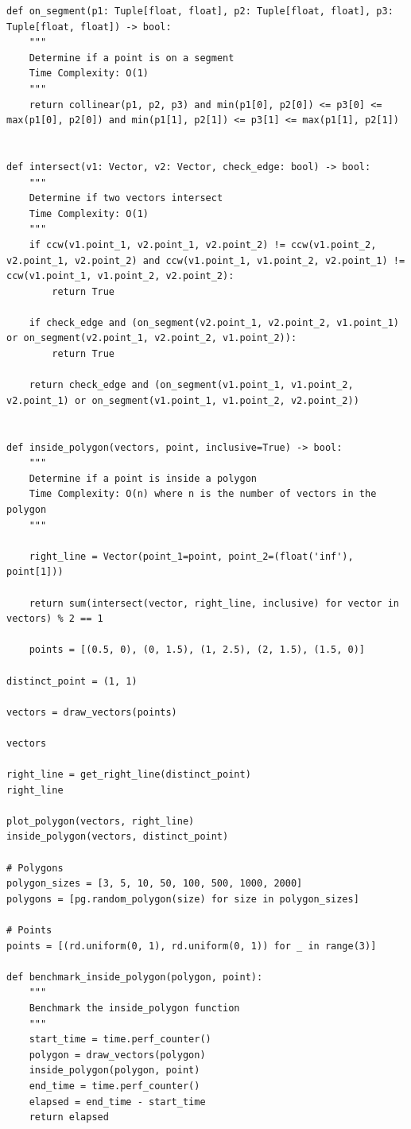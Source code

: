 \documentclass{labReport}
\begin{document}
\begin{verbatim}
def on_segment(p1: Tuple[float, float], p2: Tuple[float, float], p3: Tuple[float, float]) -> bool:
    """
    Determine if a point is on a segment
    Time Complexity: O(1)
    """
    return collinear(p1, p2, p3) and min(p1[0], p2[0]) <= p3[0] <= max(p1[0], p2[0]) and min(p1[1], p2[1]) <= p3[1] <= max(p1[1], p2[1])


def intersect(v1: Vector, v2: Vector, check_edge: bool) -> bool:
    """
    Determine if two vectors intersect
    Time Complexity: O(1)
    """
    if ccw(v1.point_1, v2.point_1, v2.point_2) != ccw(v1.point_2, v2.point_1, v2.point_2) and ccw(v1.point_1, v1.point_2, v2.point_1) != ccw(v1.point_1, v1.point_2, v2.point_2):
        return True

    if check_edge and (on_segment(v2.point_1, v2.point_2, v1.point_1) or on_segment(v2.point_1, v2.point_2, v1.point_2)):
        return True

    return check_edge and (on_segment(v1.point_1, v1.point_2, v2.point_1) or on_segment(v1.point_1, v1.point_2, v2.point_2))


def inside_polygon(vectors, point, inclusive=True) -> bool:
    """
    Determine if a point is inside a polygon
    Time Complexity: O(n) where n is the number of vectors in the polygon
    """

    right_line = Vector(point_1=point, point_2=(float('inf'), point[1]))

    return sum(intersect(vector, right_line, inclusive) for vector in vectors) % 2 == 1

    points = [(0.5, 0), (0, 1.5), (1, 2.5), (2, 1.5), (1.5, 0)]

distinct_point = (1, 1)

vectors = draw_vectors(points)

vectors

right_line = get_right_line(distinct_point)
right_line

plot_polygon(vectors, right_line)
inside_polygon(vectors, distinct_point)

# Polygons
polygon_sizes = [3, 5, 10, 50, 100, 500, 1000, 2000]
polygons = [pg.random_polygon(size) for size in polygon_sizes]

# Points
points = [(rd.uniform(0, 1), rd.uniform(0, 1)) for _ in range(3)]

def benchmark_inside_polygon(polygon, point):
    """
    Benchmark the inside_polygon function
    """
    start_time = time.perf_counter()
    polygon = draw_vectors(polygon)
    inside_polygon(polygon, point)
    end_time = time.perf_counter()
    elapsed = end_time - start_time
    return elapsed


\end{verbatim}
\end{document}
